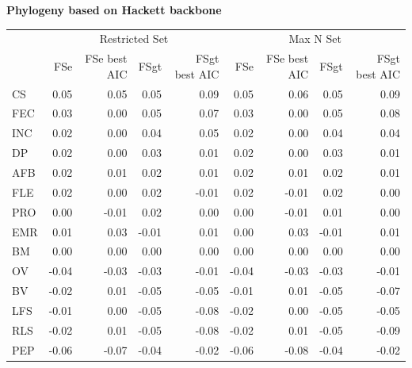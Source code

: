 \begin{table}
\begin{footnotesize}
\textbf{Phylogeny based on Hackett backbone}

\begin{tabular}{@{}l|rrrr|rrrr@{}}
\toprule
  & \multicolumn{4}{c|}{Restricted Set} & \multicolumn{4}{c}{Max N Set}\\
  & FSe & FSe best AIC & FSgt & FSgt best AIC & FSe & FSe best AIC & FSgt & FSgt best AIC\\
\midrule
CS & 0.05 & 0.05 & 0.05 & 0.09 & 0.05 & 0.06 & 0.05 & 0.09\\
FEC & 0.03 & 0.00 & 0.05 & 0.07 & 0.03 & 0.00 & 0.05 & 0.08\\
INC & 0.02 & 0.00 & 0.04 & 0.05 & 0.02 & 0.00 & 0.04 & 0.04\\
DP & 0.02 & 0.00 & 0.03 & 0.01 & 0.02 & 0.00 & 0.03 & 0.01\\
AFB & 0.02 & 0.01 & 0.02 & 0.01 & 0.02 & 0.01 & 0.02 & 0.01\\
FLE & 0.02 & 0.00 & 0.02 & -0.01 & 0.02 & -0.01 & 0.02 & 0.00\\
PRO & 0.00 & -0.01 & 0.02 & 0.00 & 0.00 & -0.01 & 0.01 & 0.00\\
EMR & 0.01 & 0.03 & -0.01 & 0.01 & 0.00 & 0.03 & -0.01 & 0.01\\
BM & 0.00 & 0.00 & 0.00 & 0.00 & 0.00 & 0.00 & 0.00 & 0.00\\
OV & -0.04 & -0.03 & -0.03 & -0.01 & -0.04 & -0.03 & -0.03 & -0.01\\
BV & -0.02 & 0.01 & -0.05 & -0.05 & -0.01 & 0.01 & -0.05 & -0.07\\
LFS & -0.01 & 0.00 & -0.05 & -0.08 & -0.02 & 0.00 & -0.05 & -0.05\\
RLS & -0.02 & 0.01 & -0.05 & -0.08 & -0.02 & 0.01 & -0.05 & -0.09\\
PEP & -0.06 & -0.07 & -0.04 & -0.02 & -0.06 & -0.08 & -0.04 & -0.02\\
\bottomrule
\end{tabular}

\end{footnotesize}
\end{table}



